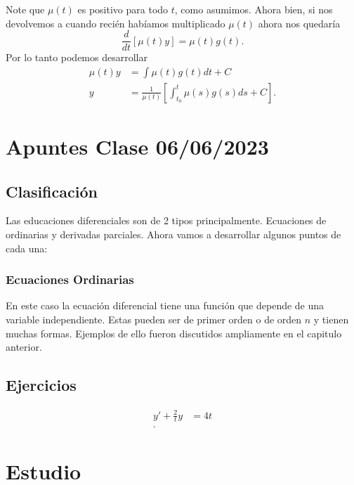 \documentclass{report}
\begin{document}
Note que $\mu\left( t \right) $ es positivo para todo $t$, como asumimos. Ahora bien, si nos devolvemos a cuando recién habíamos multiplicado $\mu\left( t \right) $ ahora nos quedaría \[
\frac{d}{dt}\left[ \mu\left( t \right) y \right] = \mu\left( t \right) g\left( t \right)
.\] Por lo tanto podemos desarrollar
\begin{align*}
  \mu\left( t \right) y &= \int \mu\left( t \right) g\left( t \right) dt + C \\
  y &= \frac{1}{\mu\left( t \right) } \left[ \int_{t_0}^{t}\mu\left( s \right) g\left( s \right) ds + C \right] 
.\end{align*}
\chapter{Apuntes Clase 06/06/2023}

\section{Clasificación}

Las educaciones diferenciales son de 2 tipos principalmente. Ecuaciones de ordinarias y derivadas parciales. Ahora vamos a desarrollar algunos puntos de cada una:
\subsection{Ecuaciones Ordinarias}
En este caso la ecuación diferencial tiene una función que depende de una variable independiente. Estas pueden ser de primer orden o de orden $n$ y tienen muchas formas. Ejemplos de ello fueron discutidos ampliamente en el capitulo anterior.
\section{Ejercicios}
\begin{align*}
  y' + \frac{2}{t}y &= 4t \\
.\end{align*}
\chapter{Estudio}
\end{document}

